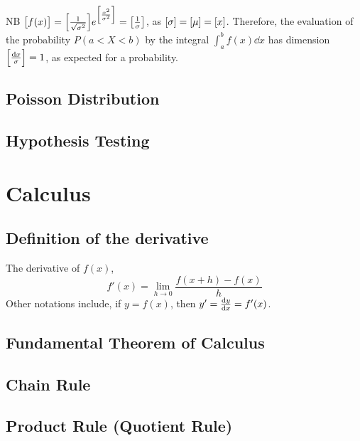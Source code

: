 \documentclass[fleqn,a4paper,11pt]{article}
\begin{document}
    NB \(\bqty{f(x)} =
        \bqty{\frac 1{\sqrt{\sigma^2}}}
        e^{\bqty{\frac{x^2}{\sigma^2}}}
      = \bqty{\frac 1\sigma}\), as
    \(\bqty{\sigma} = \bqty{\mu} = \bqty{x}\). Therefore, the
    evaluation of the probability \(P(a < X < b)\) by the integral
    \(\int_a^bf(x) \dd{x}\) has dimension
    \(\bqty{\frac{\dd{x}}{\sigma}} = 1\), as expected for a probability.

    \subsection{Poisson Distribution}


    \subsection{Hypothesis Testing}


    \section{Calculus}


    \subsection{Definition of the derivative}

    The derivative of \(f(x)\),
    \begin{equation}
    f'(x) = \lim_{h \to 0} \frac{f(x + h) - f(x)}{h}
    \end{equation}
    Other notations include, if \(y = f(x)\), then \(y' = \dv{y}{x} = f'(x)\).

    \subsection{Fundamental Theorem of Calculus} \label{sec_calc_FTC}

    \subsection{Chain Rule} \label{sec_calc_chain}

    \subsection{Product Rule (Quotient Rule)} \label{sec_calc_product}
\end{document}
